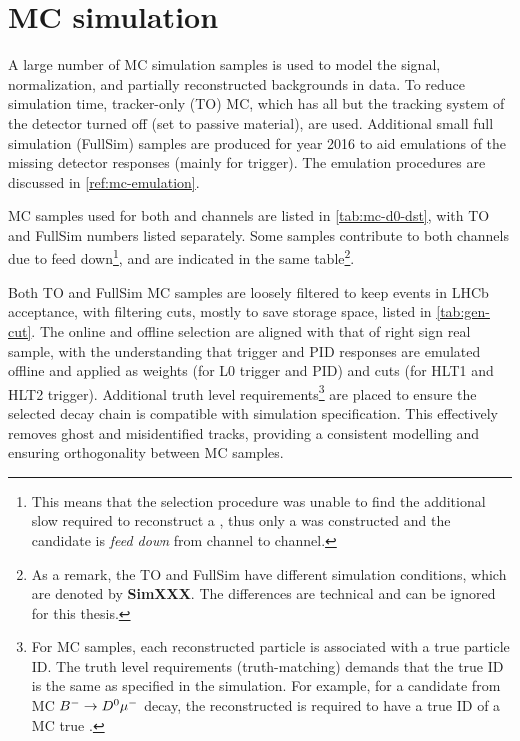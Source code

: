 \section{MC simulation}
\label{ref:sel:mc}

A large number of MC simulation samples is used to
model the signal, normalization, and partially reconstructed backgrounds in
data.
To reduce simulation time, tracker-only (TO) MC, which has all but the tracking
system of the detector turned off (set to passive material), are used.
Additional small full simulation (FullSim) samples are produced for year 2016 to
aid emulations of the missing detector responses (mainly for trigger).
The emulation procedures are discussed in \cref{ref:mc-emulation}.

MC samples used for both \Dz and \Dstar channels are listed in
\cref{tab:mc-d0-dst}, with TO and FullSim numbers listed separately.
Some samples contribute to both channels due to feed down\footnote{
    This means that the selection procedure was unable to find the
    additional slow \pion required to reconstruct a \Dstar, thus only a
    \Dz was constructed and the candidate is \emph{feed down} from \Dstar
    channel to \Dz channel.
}, and are indicated in the same table\footnote{
    As a remark, the TO and FullSim have different simulation conditions,
    which are denoted by \textbf{SimXXX}.
    The differences are technical and can be ignored for this thesis.
}.

Both TO and FullSim MC samples are loosely filtered to keep events in LHCb
acceptance, with filtering cuts, mostly to save storage space,
listed in \cref{tab:gen-cut}.
The online and offline selection are aligned with that of right sign real \muon
sample,
with the understanding that trigger and PID responses are emulated offline and
applied as weights (for L0 trigger and PID) and cuts
(for HLT1 and HLT2 trigger).
Additional truth level requirements\footnote{
    For MC samples, each reconstructed particle is associated with a true
    particle ID. The truth level requirements (truth-matching) demands that
    the true ID is the same as specified in the simulation.
    For example, for a candidate from  MC ${{{B}^-}} \rightarrow {\ensuremath{{D}^0}}{\ensuremath{\mu^-}}$ decay,
    the reconstructed \muon is required to have a true ID of a MC true \muon.
} are placed to ensure the selected decay
chain is compatible with simulation specification.
This effectively removes ghost and misidentified tracks, providing a consistent
modelling and ensuring orthogonality between MC samples.

